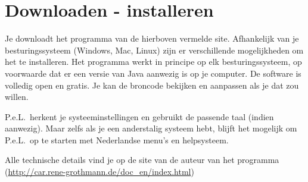 \section{Downloaden - installeren}
Je downloadt het programma van de hierboven vermelde site. Afhankelijk van je besturingssysteem (Windows, Mac, Linux) zijn er verschillende mogelijkheden om het te installeren. Het programma werkt in principe op elk besturingssysteem, op voorwaarde dat er een versie van Java aanwezig is op je computer. De software is volledig open en gratis. Je kan de broncode bekijken en aanpassen als je dat zou willen.

P.e.L.\ herkent je systeeminstellingen en gebruikt de passende taal (indien aanwezig). Maar zelfs als je een anderstalig systeem hebt, blijft het mogelijk om P.e.L.\ op te starten met Nederlandse menu's en helpsysteem.

Alle technische details vind je  op de site van de auteur van het programma (\url{http://car.rene-grothmann.de/doc_en/index.html})

